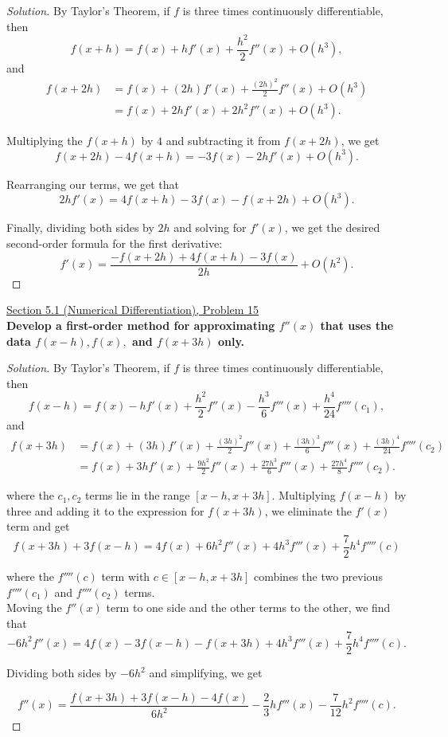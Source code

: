 \documentclass[11pt]{article}
\newenvironment{solution}
  {\renewcommand\qedsymbol{$\blacksquare$}\begin{proof}[Solution]}
  {\end{proof}}
\theoremstyle{definition}
\begin{document}
\begin{solution}
By Taylor's Theorem, if $f$ is three times continuously differentiable, then
\[ f(x+h) = f(x) + hf'(x) + \frac{h^2}{2} f''(x) + O(h^3),\]
and 
\vspace{-0.5cm}
\begin{align*}
    f(x+2h) &= f(x) + (2h)f'(x) + \frac{(2h)^2}{2} f''(x) + O(h^3) \\
    &= f(x) + 2hf'(x) + 2h^2 f''(x) + O(h^3).
\end{align*}

Multiplying the $f(x+h)$ by $4$ and subtracting it from $f(x+2h)$, we get
\[ f(x+2h) - 4f(x+h) = -3f(x) - 2hf'(x) + O(h^3). \]

Rearranging our terms, we get that 
\[ 2hf'(x) = 4f(x+h) - 3f(x) - f(x+2h) + O(h^3). \]

Finally, dividing both sides by $2h$ and solving for $f'(x)$, we get the desired second-order formula for the first derivative:
\[ \boxed{f'(x) = \frac{-f(x+2h) + 4f(x+h) - 3f(x)}{2h} + O(h^2)}. \]
    
\end{solution}

\newpage

\underline{Section 5.1 (Numerical Differentiation), Problem 15} \\

\textbf{Develop a first-order method for approximating $f''(x)$ that uses the data $f(x-h), f(x),$ and $f(x+3h)$ only.}
\begin{solution}
    By Taylor's Theorem, if $f$ is three times continuously differentiable, then
    \[ f(x-h) = f(x) - hf'(x) + \frac{h^2}{2} f''(x) - \frac{h^3}{6} f'''(x) + \frac{h^4}{24}f''''(c_1),\]
    and 
    \vspace{-0.5cm}
    \begin{align*}
        f(x+3h) &= f(x) + (3h)f'(x) + \frac{(3h)^2}{2} f''(x) + \frac{(3h)^3}{6} f'''(x) + \frac{(3h)^4}{24} f''''(c_2) \\
        &= f(x) + 3hf'(x) + \frac{9h^2}{2} f''(x) + \frac{27h^3}{6} f'''(x) + \frac{27h^4}{8} f''''(c_2).
    \end{align*}

where the $c_1, c_2$ terms lie in the range $[x-h, x+3h].$ 
Multiplying $f(x-h)$ by three and adding it to the expression for $f(x+3h)$, we eliminate the $f'(x)$ term and get
\[ f(x+3h) + 3f(x-h) = 4f(x) + 6h^2f''(x) + 4h^3f'''(x) + \frac{7}{2} h^4 f''''(c)\]

where the $f''''(c)$ term with $c \in [x-h, x+3h]$ combines the two previous $f''''(c_1)$ and $f''''(c_2)$ terms. \\

Moving the $f''(x)$ term to one side and the other terms to the other, we find that
\[ -6h^2f''(x) = 4f(x) - 3f(x-h) - f(x+3h) + 4h^3f'''(x) + \frac{7}{2}h^4 f''''(c).\]

Dividing both sides by $-6h^2$ and simplifying, we get

\[ \boxed{f''(x) = \frac{f(x+3h) + 3f(x-h) - 4f(x)}{6h^2} - \frac{2}{3}h f'''(x) - \frac{7}{12}h^2 f''''(c)}. \]
\end{solution}
\end{document}
